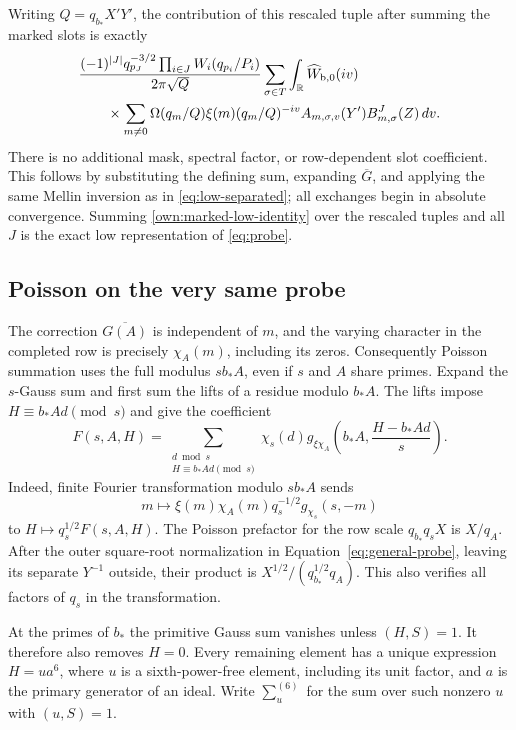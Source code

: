 \documentclass[12pt]{article}
\begin{document}
Writing \(Q=q_{b_*}X'Y'\), the contribution of this rescaled
tuple after summing the marked slots is exactly
\begin{equation}\label{own:marked-low-identity}
\begin{split}
 &\frac{(-1)^{|J|}q_{p_J}^{-3/2}
               \prod_{i\in J}W_i(q_{p_i}/P_i)}
      {2\pi\sqrt Q}
 \sum_{\sigma\in T}\int_{\mathbb R}\widehat W_{\rm b,0}(iv)\\
 &\qquad{}\times
 \sum_{m\ne0}\Omega(q_m/Q)\xi(m)(q_m/Q)^{-iv}
       A_{m,\sigma,v}(Y')B^J_{m,\sigma}(Z)\,dv .
\end{split}
\end{equation}
There is no additional mask, spectral factor, or row-dependent
slot coefficient.  This follows by substituting the defining sum,
expanding \(\overline G\), and applying the same Mellin inversion
as in \eqref{eq:low-separated}; all exchanges begin in absolute
convergence.  Summing \eqref{own:marked-low-identity} over the
rescaled tuples and all \(J\) is the exact low representation of
\eqref{eq:probe}.
\subsection{Poisson on the very same probe}

The correction $\overline{G(A)}$ is independent of $m$, and the
varying character in the completed row is precisely $\chi_A(m)$,
including its zeros.  Consequently Poisson summation uses the full
modulus $sb_*A$, even if $s$ and $A$ share primes.  Expand the
$s$-Gauss sum and first sum the lifts of a residue modulo $b_*A$.
The lifts impose $H\equiv b_*Ad\pmod s$ and give the coefficient
\begin{equation}\label{eq:local-F}
 F(s,A,H)=\sum_{\substack{d\bmod s\\H\equiv b_*Ad\pmod s}}
 \chi_s(d)g_{\xi\chi_A}\!\left(b_*A,\frac{H-b_*Ad}{s}\right).
\end{equation}
Indeed, finite Fourier transformation modulo \(sb_*A\) sends
\[
 m\longmapsto \xi(m)\chi_A(m)q_s^{-1/2}g_{\chi_s}(s,-m)
\]
to \(H\longmapsto q_s^{1/2}F(s,A,H)\).
The Poisson prefactor for the row scale
$q_{b_*}q_sX$ is $X/q_A$.  After the outer square-root normalization in
Equation~\eqref{eq:general-probe}, leaving its separate $Y^{-1}$ outside,
their product is
$X^{1/2}/(q_{b_*}^{1/2}q_A)$.  This also verifies all factors of
$q_s$ in the transformation.

At the primes of $b_*$ the primitive Gauss sum vanishes unless
$(H,S)=1$.  It therefore also removes $H=0$.  Every remaining
element has a unique expression
$H=ua^6$, where $u$ is a sixth-power-free element, including its
unit factor, and $a$ is the primary generator of an ideal.  Write
$\sum_u^{(6)}$ for the sum over such nonzero $u$ with $(u,S)=1$.
\end{document}
